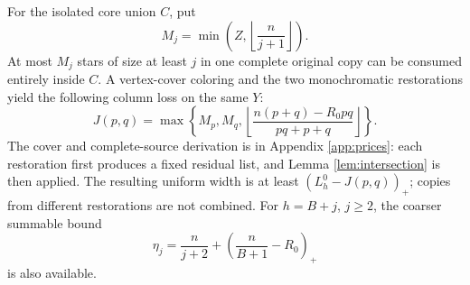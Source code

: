 \documentclass[11pt,a4paper]{article}
\newcommand{\pos}[1]{\left(#1\right)_+}
\newcommand{\floor}[1]{\left\lfloor#1\right\rfloor}
\theoremstyle{definition}
\begin{document}
For the isolated core union $C$, put
\[
M_j=\min\left(Z,\floor{\frac n{j+1}}\right).
\]
At most $M_j$ stars of size at least $j$ in one complete original copy can be consumed entirely inside $C$. A vertex-cover coloring and the two monochromatic restorations yield the following column loss on the same $Y$:
\begin{equation}\label{eq:pointtax}
J(p,q)=\max\left\{M_p,M_q,
\floor{\frac{n(p+q)-R_0pq}{pq+p+q}}\right\}.
\end{equation}
The cover and complete-source derivation is in Appendix \ref{app:prices}: each restoration first produces a fixed residual list, and Lemma \ref{lem:intersection} is then applied. The resulting uniform width is at least $(L_h^0-J(p,q))_+$; copies from different restorations are not combined. For $h=B+j$, $j\ge2$, the coarser summable bound
\begin{equation}\label{eq:eta}
\eta_j=\frac n{j+2}+\pos{\frac n{B+1}-R_0}
\end{equation}
is also available.
\end{document}
